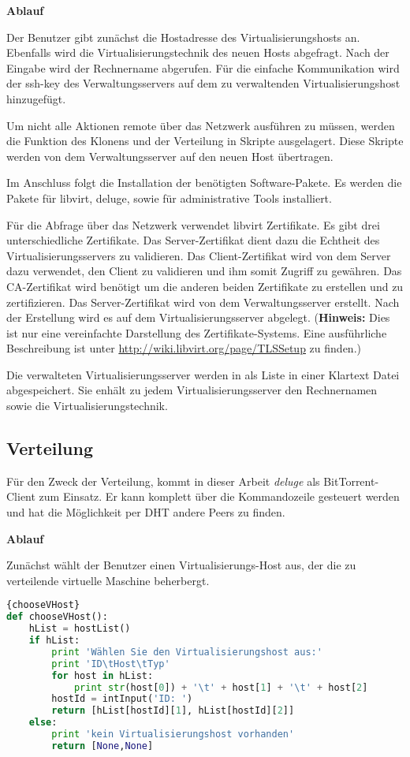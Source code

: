 \textbf{Ablauf}

Der Benutzer gibt zunächst die Hostadresse des Virtualisierungshosts an. Ebenfalls wird die Virtualisierungstechnik des neuen Hosts abgefragt. Nach der Eingabe wird der Rechnername abgerufen. Für die einfache Kommunikation wird der ssh-key des Verwaltungsservers auf dem zu verwaltenden Virtualisierungshost hinzugefügt. 

Um nicht alle Aktionen remote über das Netzwerk ausführen zu müssen, werden die Funktion des Klonens und der Verteilung in Skripte ausgelagert. Diese Skripte werden von dem Verwaltungsserver auf den neuen Host übertragen.

Im Anschluss folgt die Installation der benötigten Software-Pakete. Es werden die Pakete für libvirt, deluge, sowie für administrative Tools installiert. 

Für die Abfrage über das Netzwerk verwendet libvirt Zertifikate. Es gibt drei unterschiedliche Zertifikate. Das Server-Zertifikat dient dazu die Echtheit des Virtualisierungsservers zu validieren. Das Client-Zertifikat wird von dem Server dazu verwendet, den Client zu validieren und ihm somit Zugriff zu gewähren. Das CA-Zertifikat wird benötigt um die anderen beiden Zertifikate zu erstellen und zu zertifizieren. Das Server-Zertifikat wird von dem Verwaltungsserver erstellt. Nach der Erstellung wird es auf dem Virtualisierungsserver abgelegt. (\textbf{Hinweis:} Dies ist nur eine vereinfachte Darstellung des Zertifikate-Systems. Eine ausführliche Beschreibung ist unter \href{http://wiki.libvirt.org/page/TLSSetup}{http://wiki.libvirt.org/page/TLSSetup} zu finden.) 

Die verwalteten Virtualisierungsserver werden in als Liste in einer Klartext Datei abgespeichert. Sie enhält zu jedem Virtualisierungsserver den Rechnernamen sowie die Virtualisierungstechnik. 

\subsection{Verteilung}
Für den Zweck der Verteilung, kommt in dieser Arbeit \textit{deluge} als BitTorrent-Client zum Einsatz. Er kann komplett über die Kommandozeile gesteuert werden und hat die Möglichkeit per DHT andere Peers zu finden.

\textbf{Ablauf}

Zunächst wählt der Benutzer einen Virtualisierungs-Host aus, der die zu verteilende virtuelle Maschine beherbergt. 
\\
\begin{lstlisting}[caption=VHost-Auswahl,language=Python,label=chooseVHost]{chooseVHost}
def chooseVHost():
	hList = hostList()
	if hList:
		print 'Wählen Sie den Virtualisierungshost aus:'
		print 'ID\tHost\tTyp'
		for host in hList:
			print str(host[0]) + '\t' + host[1] + '\t' + host[2]
		hostId = intInput('ID: ')
		return [hList[hostId][1], hList[hostId][2]]
	else:
		print 'kein Virtualisierungshost vorhanden'
		return [None,None]
\end{lstlisting}

